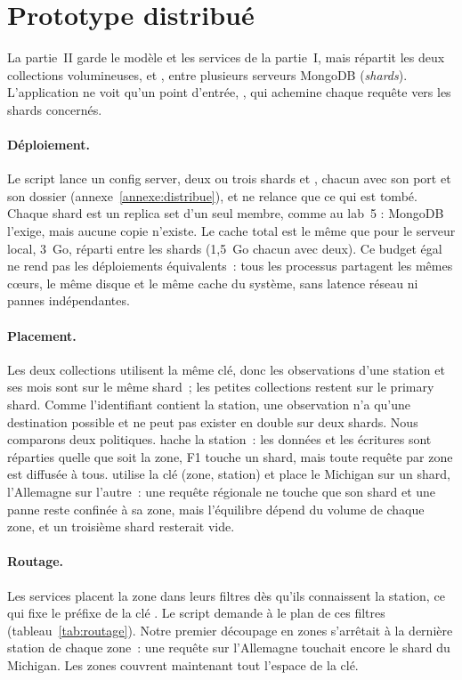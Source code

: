 \section{Prototype distribué}
\label{sec:distribue}

La partie~II garde le modèle et les services de la partie~I, mais répartit les deux collections volumineuses,  et , entre plusieurs serveurs MongoDB (\emph{shards}). L'application ne voit qu'un point d'entrée, , qui achemine chaque requête vers les shards concernés.

\paragraph{Déploiement.} Le script  lance un config server, deux ou trois shards et , chacun avec son port et son dossier (annexe~\ref{annexe:distribue}), et ne relance que ce qui est tombé. Chaque shard est un replica set d'un seul membre, comme au lab~5 : MongoDB l'exige, mais aucune copie n'existe. Le cache total est le même que pour le serveur local, 3~Go, réparti entre les shards (1,5~Go chacun avec deux). Ce budget égal ne rend pas les déploiements équivalents~: tous les processus partagent les mêmes cœurs, le même disque et le même cache du système, sans latence réseau ni pannes indépendantes.

\paragraph{Placement.} Les deux collections utilisent la même clé, donc les observations d'une station et ses mois sont sur le même shard~; les petites collections restent sur le primary shard. Comme l'identifiant  contient la station, une observation n'a qu'une destination possible et ne peut pas exister en double sur deux shards. Nous comparons deux politiques.  hache la station~: les données et les écritures sont réparties quelle que soit la zone, F1 touche un shard, mais toute requête par zone est diffusée à tous.  utilise la clé (zone, station) et place le Michigan sur un shard, l'Allemagne sur l'autre~: une requête régionale ne touche que son shard et une panne reste confinée à sa zone, mais l'équilibre dépend du volume de chaque zone, et un troisième shard resterait vide.

\paragraph{Routage.} Les services placent la zone dans leurs filtres dès qu'ils connaissent la station, ce qui fixe le préfixe de la clé . Le script  demande à  le plan de ces filtres (tableau~\ref{tab:routage}). Notre premier découpage en zones s'arrêtait à la dernière station de chaque zone~: une requête sur l'Allemagne touchait encore le shard du Michigan. Les zones couvrent maintenant tout l'espace de la clé.


